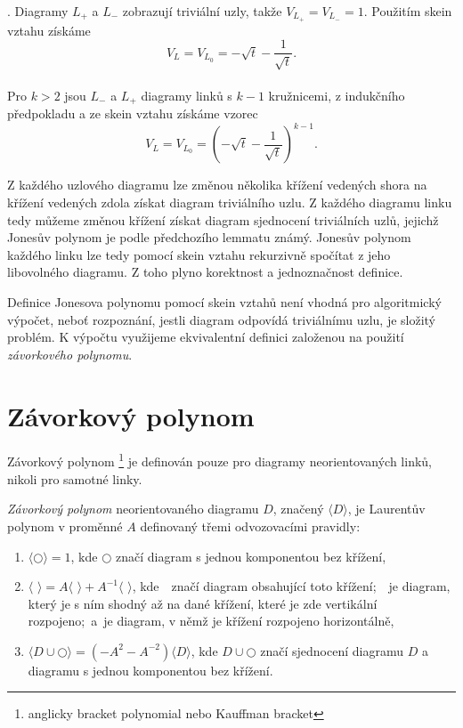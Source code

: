 \begin{dukaz}
. Diagramy $L_+$ a $L_-$ zobrazují triviální uzly, takže $V_{L_+} = V_{L_-} = 1$. Použitím skein vztahu získáme $$V_ L = V_{L_0} = - \sqrt{t} -\frac{1}{\sqrt{t}} .$$ \\
Pro $k > 2$ jsou $L_-$ a $L_+ $ diagramy linků s $k-1$ kružnicemi, z indukčního předpokladu a ze skein vztahu získáme vzorec $$V_ L = V_{L_0} = \left(- \sqrt{t} -\frac{1}{\sqrt{t}}\right) ^{k-1}.$$
\end{dukaz}  

\begin{pozn}
Z každého uzlového diagramu lze změnou několika křížení vedených shora na křížení vedených zdola získat diagram triviálního uzlu. Z každého diagramu linku tedy můžeme změnou křížení získat diagram sjednocení triviálních uzlů, jejichž Jonesův polynom je podle předchozího lemmatu známý. Jonesův polynom každého linku lze tedy pomocí skein vztahu rekurzivně spočítat z jeho libovolného diagramu. Z toho plyno korektnost a jednoznačnost definice.
\end{pozn}


Definice Jonesova polynomu pomocí skein vztahů není vhodná pro algoritmický výpočet, neboť rozpoznání, jestli diagram odpovídá triviálnímu uzlu, je složitý problém. K výpočtu využijeme ekvivalentní definici založenou na použití \emph{závorkového polynomu}.

\section{Závorkový polynom}
Závorkový polynom \footnote{anglicky bracket polynomial nebo Kauffman bracket} je definován pouze pro diagramy neorientovaných linků, nikoli pro samotné linky.

\begin{definice}\label{def01:2}
\emph{Závorkový polynom} neorientovaného diagramu $D$, značený $\langle D \rangle$, je Laurentův polynom v proměnné $A$ definovaný třemi odvozovacími pravidly:
\begin{enumerate}
\item
$ \langle \bigcirc  \rangle = 1$, kde $\bigcirc$ značí diagram s jednou komponentou bez křížení,
\item
$ \langle$ \pluskriz
$\rangle = A  \langle $
\vertkriz
$ \rangle + A^{-1}  \langle $
\horkriz
$\rangle $, kde~\pluskriz~značí diagram obsahující toto křížení;~\vertkriz~je diagram, který je s ním shodný až na dané křížení, které je zde vertikální rozpojeno;~a~\horkriz je diagram, v němž je křížení rozpojeno horizontálně,
\item
$ \langle D \cup \bigcirc \rangle = (-A^2 - A^{-2}) \langle D \rangle$, kde $D \cup \bigcirc $ značí sjednocení diagramu $D$ a diagramu s jednou komponentou bez křížení.
\end{enumerate}
\end{definice}

